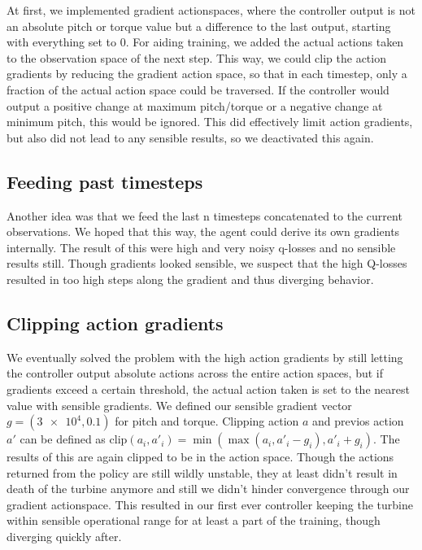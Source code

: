 \documentclass[hyperref,german,beleg]{cgvpub}
\begin{document}
At first, we implemented gradient actionspaces, where the controller output is not an absolute pitch or torque value but a difference to the last output, starting with everything set to 0. For aiding training, we added the actual actions taken to the observation space of the next step. This way, we could clip the action gradients by reducing the gradient action space, so that in each timestep, only a fraction of the actual action space could be traversed. If the controller would output a positive change at maximum pitch/torque or a negative change at minimum pitch, this would be ignored. This did effectively limit action gradients, but also did not lead to any sensible results, so we deactivated this again.

\subsection{Feeding past timesteps}

Another idea was that we feed the last n timesteps concatenated to the current observations. We hoped that this way, the agent could derive its own gradients internally. The result of this were high and very noisy q-losses and no sensible results still. Though gradients looked sensible, we suspect that the high Q-losses resulted in too high steps along the gradient and thus diverging behavior. 

\subsection{Clipping action gradients}
\label{sec:clip_act_grad}
We eventually solved the problem with the high action gradients by still letting the controller output absolute actions across the entire action spaces, but if gradients exceed a certain threshold, the actual action taken is set to the nearest value with sensible gradients. We defined our sensible gradient vector $g = (\num{3e4}, 0.1)$ for pitch and torque. Clipping action $a$ and previos action $a'$ can be defined as $\mathrm{clip}(a_i, a'_i) = \min(\max(a_i, a'_i -g_i), a'_i + g_i)$. The results of this are again clipped to be in the action space. Though the actions returned from the policy are still wildly unstable, they at least didn't result in death of the turbine anymore and still we didn't hinder convergence through our gradient actionspace. This resulted in our first ever controller keeping the turbine within sensible operational range for at least a part of the training, though diverging quickly after.
\end{document}
